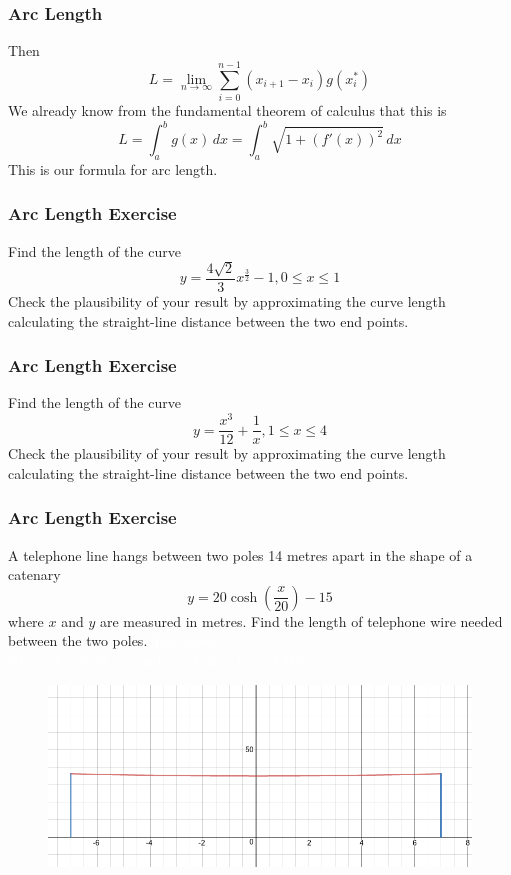 \documentclass[xcolor=dvipsnames]{beamer}
\begin{document}
\begin{frame}
  \frametitle{Arc Length}
Then
\begin{equation}
  \label{eq:geiphofi}
    L=\lim_{n\rightarrow\infty}\sum_{i=0}^{n-1}\left(x_{i+1}-x_{i}\right)g(x_{i}^{\ast})
\end{equation}
We already know from the fundamental theorem of calculus that this is
\begin{equation}
  \label{eq:yemaezov}
    L=\int_{a}^{b}g(x)\,dx=\int_{a}^{b}\sqrt{1+\left(f'(x)\right)^{2}}\,dx
\end{equation}
This is our \alert{formula for arc length}.
\end{frame}

\begin{frame}
  \frametitle{Arc Length Exercise}
{\ubung} Find the length of the curve
  \begin{equation}
    \label{eq:ahwushei}
    y=\frac{4\sqrt{2}}{3}x^{\frac{3}{2}}-1,0\leq{}x\leq{}1
  \end{equation}
Check the plausibility of your result by approximating the curve
length calculating the straight-line distance between the two end
points.
\end{frame}

\begin{frame}
  \frametitle{Arc Length Exercise}
{\ubung} Find the length of the curve
  \begin{equation}
    \label{eq:aecejaej}
    y=\frac{x^{3}}{12}+\frac{1}{x},1\leq{}x\leq{}4
  \end{equation}
Check the plausibility of your result by approximating the curve
length calculating the straight-line distance between the two end
points.
\end{frame}

\begin{frame}
  \frametitle{Arc Length Exercise}
{\ubung} A telephone line hangs between two poles 14 metres apart in
the shape of a catenary
\begin{equation}
  \label{eq:lufaebeg}
  y=20\cosh\left(\frac{x}{20}\right)-15
\end{equation}
where $x$ and $y$ are measured in metres. Find the length of telephone
wire needed between the two poles. \textcolor{white}{The answer is $20(\sinh(7/20)-\sinh(-7/20))=14.288$.}
\begin{figure}[h]
  \includegraphics[scale=0.22]{./diagrams/telwire.png}
\end{figure}
\end{frame}
\end{document}
